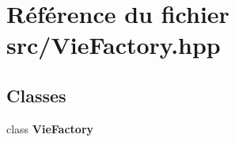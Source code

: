\section{Référence du fichier src/\-Vie\-Factory.hpp}
\label{_vie_factory_8hpp}
\subsection*{Classes}
\begin{DoxyCompactItemize}
\item 
class {\bf Vie\-Factory}
\end{DoxyCompactItemize}
